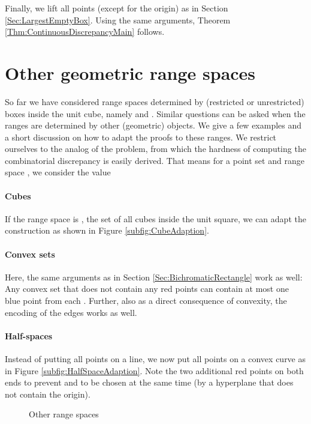 \documentclass[12pt]{article}
\begin{document}
Finally, we lift all points (except for the origin) as in Section \ref{Sec:LargestEmptyBox}. Using the same arguments, Theorem \ref{Thm:ContinuousDiscrepancyMain} follows.





\section{Other geometric range spaces}
So far we have considered range spaces determined by (restricted or unrestricted) boxes inside the unit cube, namely  and . Similar questions can be asked when the ranges are determined by other (geometric) objects. We give a few examples and a short discussion on how to adapt the proofs to these ranges. We restrict ourselves to the analog of the  problem, from which the hardness of computing the combinatorial discrepancy is easily derived. That means for a point set  and range space , we consider the value


\paragraph{Cubes}
If the range space is , the set of all cubes inside the unit square, we can adapt the construction as shown in Figure \ref{subfig:CubeAdaption}.

\paragraph{Convex sets}
Here, the same arguments as in Section \ref{Sec:BichromaticRectangle} work as well: Any convex set that does not contain any red points can contain at most one blue point from each . Further, also as a direct consequence of convexity, the encoding of the edges works as well.

\paragraph{Half-spaces}
Instead of putting all points on a line, we now put all points on a convex curve as in Figure \ref{subfig:HalfSpaceAdaption}. Note the two additional red points on both ends to prevent  and  to be chosen at the same time (by a hyperplane that does not contain the origin).

\begin{figure}\label{fig:OtherRanges}
	\hfill
	\hfill
	\caption{Other range spaces}
\end{figure}
\end{document}
